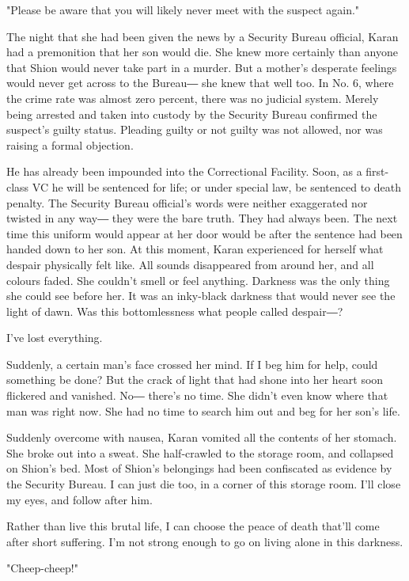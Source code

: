 "Please be aware that you will likely never meet with the suspect
again."

The night that she had been given the news by a Security Bureau
official, Karan had a premonition that her son would die. She knew more
certainly than anyone that Shion would never take part in a murder. But
a mother's desperate feelings would never get across to the Bureau― she
knew that well too. In No. 6, where the crime rate was almost zero
percent, there was no judicial system. Merely being arrested and taken
into custody by the Security Bureau confirmed the suspect's guilty
status. Pleading guilty or not guilty was not allowed, nor was raising a
formal objection.

He has already been impounded into the Correctional Facility. Soon, as a
first-class VC he will be sentenced for life; or under special law, be
sentenced to death penalty. The Security Bureau official's words were
neither exaggerated nor twisted in any way― they were the bare truth.
They had always been. The next time this uniform would appear at her
door would be after the sentence had been handed down to her son. At
this moment, Karan experienced for herself what despair physically felt
like. All sounds disappeared from around her, and all colours faded. She
couldn't smell or feel anything. Darkness was the only thing she could
see before her. It was an inky-black darkness that would never see the
light of dawn. Was this bottomlessness what people called despair―?

I've lost everything.

Suddenly, a certain man's face crossed her mind. If I beg him for help,
could something be done? But the crack of light that had shone into her
heart soon flickered and vanished. No― there's no time. She didn't even
know where that man was right now. She had no time to search him out and
beg for her son's life.

Suddenly overcome with nausea, Karan vomited all the contents of her
stomach. She broke out into a sweat. She half-crawled to the storage
room, and collapsed on Shion's bed. Most of Shion's belongings had been
confiscated as evidence by the Security Bureau. I can just die too, in a
corner of this storage room. I'll close my eyes, and follow after him.

Rather than live this brutal life, I can choose the peace of death
that'll come after short suffering. I'm not strong enough to go on
living alone in this darkness.

"Cheep-cheep!"

